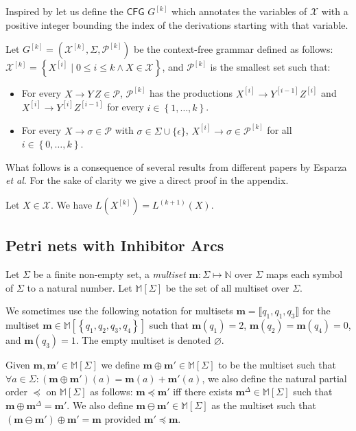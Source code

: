 \documentclass{fsttcs}
\def\set#1{{\left\{ #1 \right\}}}
\def\multi#1{{\llbracket #1 \rrbracket}}
\def\nats{{\mathbb{N}}}
\newcommand{\multiset}[1]{{\mathbb{M}[ #1 ]}}
\def\mmap{\mathbf{m}}
\def\prod{\mathcal{P}}
\def\cfg{\mathsf{CFG}}
\begin{document}
Inspired by \cite{egkl11-ipl,EKL10:JACM,EKL08:icalp} let us define the
\(\cfg\) $G^{[k]}$ which annotates the variables of \(\mathcal{X}\)
with a positive integer bounding the index of the derivations starting with
that variable. 

\begin{definition}
Let
 \(G^{[k]}=(\mathcal{X}^{[k]},\Sigma,\prod^{[k]})\) be the  context-free grammar defined as follows:  \(\mathcal{X}^{[k]}=\set{X^{[i]}\mid 0\leq i \leq k \land X\in\mathcal{X}}\), and  \(\prod^{[k]}\) is the smallest  set such that:
\begin{itemize}
\item For every $X\rightarrow Y\, Z\in \prod$, \(\prod^{[k]}\)
has the productions $X^{[i]} \rightarrow Y^{[i-1]} Z^{[i]}$ and $ X^{[i]} \rightarrow Y^{[i]} Z^{[i-1]}$ for every
$i\in\set{1,\dots,k}$.
\item For every $X \rightarrow \sigma\in\prod$ with  \(\sigma\in\Sigma \cup \{\epsilon\} \), 
$X^{[i]} \rightarrow
\sigma \in \prod^{[k]}$ for all
$i\in\set{0,\dots,k}$.
\end{itemize}
\label{def:cfgbounded}
\end{definition}

What follows is a consequence of several results from different papers by
Esparza \textit{et al}. For the sake of clarity we give a direct proof in the appendix.
{\begin{lemma}
	\label{lem1} Let \(X\in\mathcal{X}\). We have \(L(X^{[k]})=L^{(k+1)}(X)\).
\end{lemma}
}


\subsection{Petri nets with Inhibitor Arcs}

Let \(\Sigma\) be a finite non-empty set, a \emph{multiset} $\mmap\colon
\Sigma\mapsto\nats$ over $\Sigma$ maps each symbol of $\Sigma$ to a natural
number.  Let $\multiset{\Sigma}$ be the set of all multiset over $\Sigma$.

We sometimes use the following notation for multisets
$\mmap=\multi{q_1,q_1,q_3}$ for the multiset
$\mmap\in\multiset{\set{q_1,q_2,q_3,q_4}}$ such that $\mmap(q_1)=2$,
$\mmap(q_2)=\mmap(q_4)=0$, and $\mmap(q_3)=1$. The empty multiset is denoted
\(\varnothing\).  

Given $\mmap,\mmap'\in\multiset{\Sigma}$ we define $\mmap\oplus
\mmap'\in\multiset{\Sigma}$ to be the multiset such that $\forall a\in\Sigma\colon
(\mmap\oplus \mmap')(a)=\mmap(a)+\mmap'(a)$, we also define the natural partial order
$\preceq$ on $\multiset{\Sigma}$ as follows: $\mmap\preceq\mmap'$ if{}f there
exists $\mmap^{\Delta}\in\multiset{\Sigma}$ such that
$\mmap\oplus\mmap^{\Delta}=\mmap'$.  We also define
\(\mmap\ominus\mmap'\in\multiset{\Sigma}\) as the multiset such that
\((\mmap\ominus\mmap')\oplus\mmap'=\mmap\) provided \(\mmap'\preceq \mmap\).
\end{document}
